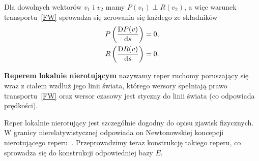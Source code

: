 Dla dowolnych wektorów $v_1$ i $v_2$ mamy $P(v_1)\perp R(v_2)$,
a więc warunek transportu~\eqref{FW} 
sprowadza się zerowania się każdego ze składników
\begin{align*}
P \left(\frac{\text{D} P(v)}{\text{d} s} \right)  = 0 ,\\
R \left( \frac{\text{D} R(v)}{\text{d} s} \right) = 0.
\end{align*}




\begin{definition}
\textbf{Reperem lokalnie nierotującym} nazywamy reper ruchomy poruszający
się wraz z ciałem wzdłuż jego linii świata, którego 
wersory spełniają prawo transportu~\eqref{FW} oraz wersor czasowy 
jest styczny do linii świata (co odpowiada prędkości).
\end{definition}
Reper lokalnie nierotujący jest szczególnie dogodny do opisu zjawisk 
fizycznych. W granicy nierelatywistycznej odpowiada on Newtonowskiej 
koncepcji nierotującego reperu~\cite{synge1960}. Przeprowadzimy teraz
konstrukcję takiego reperu, co sprowadza się do konstrukcji 
odpowiedniej bazy $E$.

